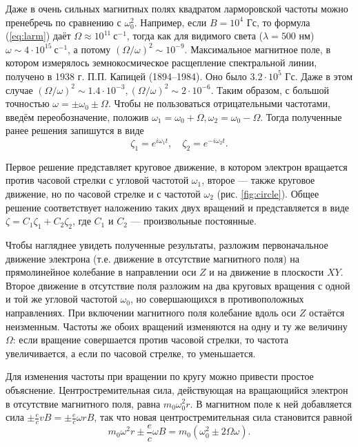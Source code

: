 \documentclass[12pt]{article}
\begin{document}
  Даже в очень сильных магнитных полях квадратом ларморовской частоты можно пренебречь по сравнению с $\omega_0^2$. Например, если $B = 10^4$ Гс, то формула (\ref{eq:larm}) даёт $\Omega \approx 10^{11}~\text{с}^{-1}$, тогда как для видимого света ($\lambda = 500$ нм) $\omega \sim 4 \cdot 10^{15}~\text{с}^{-1}$, а потому $(\Omega/\omega)^2 \sim 10^{-9}$. Максимальное магнитное поле, в котором измерялось земнокосмическое расщепление спектральной линии, получено в 1938 г. П.П. Капицей (1894–1984). Оно было $3.2 \cdot 10^5$ Гс. Даже в этом случае $(\Omega/\omega)^2 \sim 1.4 \cdot 10^{-3}, (\Omega/\omega)^2 \sim 2 \cdot 10^{-6}$. Таким образом, с большой точностью $\omega = \pm \omega_0 \pm \Omega$. Чтобы не пользоваться отрицательными частотами, введём переобозначение, положив $\omega_1 = \omega_0 + \Omega, \omega_2 = \omega_0 - \Omega$. Тогда полученные ранее решения запишутся в виде
  \[
  \zeta_1 = e^{i\omega_1 t}, \quad \zeta_2 = e^{-i\omega_2 t}.
  \]

  Первое решение представляет круговое движение, в котором электрон вращается против часовой стрелки с угловой частотой $\omega_1$, второе — также круговое движение, но по часовой стрелке и с частотой $\omega_2$ (рис. \ref{fig:circle}). Общее решение соответствует наложению таких двух вращений и представляется в виде $\zeta = C_1 \zeta_1 + C_2 \zeta_2$, где $C_1$ и $C_2$ — произвольные постоянные.

  Чтобы нагляднее увидеть полученные результаты, разложим первоначальное движение электрона (т.е. движение в отсутствие магнитного поля) на прямолинейное колебание в направлении оси $Z$ и на движение в плоскости $XY$. Второе движение в отсутствие поля разложим на два круговых вращения с одной и той же угловой частотой $\omega_0$, но совершающихся в противоположных направлениях. При включении магнитного поля колебание вдоль оси $Z$ остаётся неизменным. Частоты же обоих вращений изменяются на одну и ту же величину $\Omega$: если вращение совершается против часовой стрелки, то частота увеличивается, а если по часовой стрелке, то уменьшается.

  Для изменения частоты при вращении по кругу можно привести простое объяснение. Центростремительная сила, действующая на вращающийся электрон в отсутствие магнитного поля, равна $m_0 \omega_0^2 r$. В магнитном поле к ней добавляется сила $\pm \frac{e}{c} v B = \pm \frac{e}{c} \omega r B$, так что новая центростремительная сила становится равной
  \[
  m_0 \omega^2 r \pm \frac{e}{c} \omega B = m_0 (\omega_0^2 \pm 2\Omega \omega).
  \]
\end{document}
